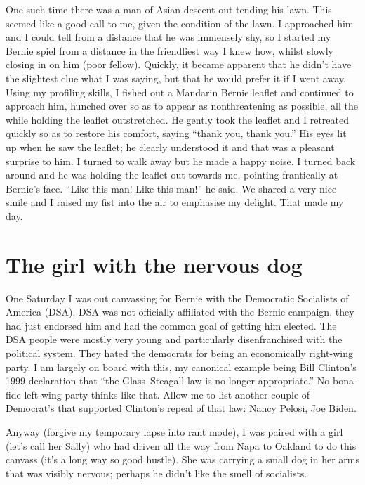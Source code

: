 \documentclass[]{book}
\begin{document}
One such time there was a man of Asian descent out tending his lawn. This seemed like a good call to me, given the condition of the lawn. I approached him and I could tell from a distance that he was immensely shy, so I started my Bernie spiel from a distance in the friendliest way I knew how, whilst slowly closing in on him (poor fellow). Quickly, it became apparent that he didn't have the slightest clue what I was saying, but that he would prefer it if I went away. Using my profiling skills, I fished out a Mandarin Bernie leaflet and continued to approach him, hunched over so as to appear as nonthreatening as possible, all the while holding the leaflet outstretched. He gently took the leaflet and I retreated quickly so as to restore his comfort, saying ``thank you, thank you.'' His eyes lit up when he saw the leaflet; he clearly understood it and that was a pleasant surprise to him. I turned to walk away but he made a happy noise. I turned back around and he was holding the leaflet out towards me, pointing frantically at Bernie's face. ``Like this man! Like this man!'' he said. We shared a very nice smile and I raised my fist into the air to emphasise my delight. That made my day.

\hypertarget{the-girl-with-the-nervous-dog}{%
\section{The girl with the nervous dog}\label{the-girl-with-the-nervous-dog}}

One Saturday I was out canvassing for Bernie with the Democratic Socialists of America (DSA). DSA was not officially affiliated with the Bernie campaign, they had just endorsed him and had the common goal of getting him elected. The DSA people were mostly very young and particularly disenfranchised with the political system. They hated the democrats for being an economically right-wing party. I am largely on board with this, my canonical example being Bill Clinton's 1999 declaration that ``the Glass--Steagall law is no longer appropriate.'' No bona-fide left-wing party thinks like that. Allow me to list another couple of Democrat's that supported Clinton's repeal of that law: Nancy Pelosi, Joe Biden.

Anyway (forgive my temporary lapse into rant mode), I was paired with a girl (let's call her Sally) who had driven all the way from Napa to Oakland to do this canvass (it's a long way so good hustle). She was carrying a small dog in her arms that was visibly nervous; perhaps he didn't like the smell of socialists.
\end{document}

